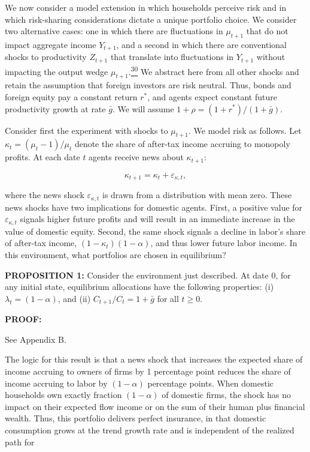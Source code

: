\documentclass[11pt]{article}
\begin{document}
We now consider a model extension in which households perceive risk and in which risk-sharing considerations dictate a unique portfolio choice. We consider two alternative cases: one in which there are fluctuations in $\mu _{t+1}$ that do not impact aggregate income $Y_{t+1}$, and a second in which there are conventional shocks to productivity $Z_{t+1}$ that translate into fluctuations in $Y_{t+1}$ without impacting the output wedge $\mu _{t+1}$.\hyperlink{fn:30}{\textsuperscript{30}} We abstract here from all other shocks and retain the assumption that foreign investors are risk neutral. Thus, bonds and foreign equity pay a constant return $r^{*}$, and agents expect constant future productivity growth at rate $\bar{g}$. We will assume $1+\rho =(1+r^{*})/(1+\bar{g})$.

Consider first the experiment with shocks to $\mu _{t+1}$. We model risk as follows. Let $\kappa _{t}=(\mu _{t}-1)/\mu _{t}$ denote the share of after-tax income accruing to monopoly profits. At each date $t$ agents receive news about $\kappa _{t+1}$:


\[
\kappa_{t+1}=\kappa_t+\varepsilon_{\kappa,t},
\]


where the news shock $\varepsilon _{\kappa ,t}$ is drawn from a distribution with mean zero. These news shocks have two implications for domestic agents. First, a positive value for $\varepsilon _{\kappa ,t}$ signals higher future profits and will result in an immediate increase in the value of domestic equity. Second, the same shock signals a decline in labor’s share of after-tax income, $(1-\kappa _{t})(1-\alpha )$, and thus lower future labor income. In this environment, what portfolios are chosen in equilibrium?


\hypertarget{prop:1}{}\textbf{PROPOSITION 1:} Consider the environment just described. At date 0, for any initial state, equilibrium allocations have the following properties: (i) $\lambda _{t}=(1-\alpha )$, and (ii) $C_{t+1}/C_{t}=1+\bar{g}$ for all $t\geq 0$.


\textbf{PROOF:}


See Appendix B.


The logic for this result is that a news shock that increases the expected share of income accruing to owners of firms by 1 percentage point reduces the share of income accruing to labor by $(1-\alpha )$ percentage points. When domestic households own exactly fraction $(1-\alpha )$ of domestic firms, the shock has no impact on their expected flow income or on the sum of their human plus financial wealth. Thus, this portfolio delivers perfect insurance, in that domestic consumption grows at the trend growth rate and is independent of the realized path for
\end{document}
